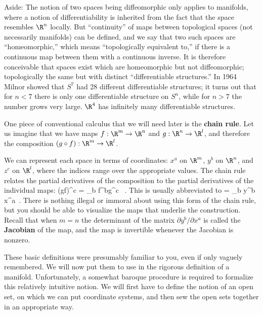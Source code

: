 Aside: The notion of two spaces being diffeomorphic only applies to
manifolds, where a notion of differentiability is inherited from the
fact that the space resembles $\R^n$ locally.  But ``continuity'' of maps
between topological spaces (not necessarily manifolds) can be defined,
and we say that two such spaces are ``homeomorphic,'' which means 
``topologically equivalent to,'' if there is a continuous map 
between them with a continuous inverse.  It is therefore conceivable that
spaces exist which are homeomorphic but not diffeomorphic; topologically
the same but with distinct ``differentiable structures.''  In 1964 Milnor 
showed that $S^7$ had 28 different differentiable structures; 
it turns out that for $n<7$ there is only one differentiable 
structure on $S^n$, while for $n>7$ the number grows very large.  
$\R^4$ has infinitely many differentiable structures.

One piece of conventional calculus that we will need later is the
{\bf chain rule}.  Let us imagine that we have maps $f:\R^m\rightarrow
\R^n$ and $g:\R^n\rightarrow \R^l$, and therefore the composition
$(g\circ f):\R^m\rightarrow\R^l$.  

\begin{figure}[h]
  \centerline{
  }
\end{figure}

\noindent We can represent each space in terms of coordinates:
$x^a$ on $\R^m$, $y^b$ on $\R^n$, and $z^c$ on $\R^l$, where the
indices range over the appropriate values. 
The chain rule relates the partial derivatives of the 
composition to the partial derivatives of the individual maps:
\be
  {{\partial}}(g\circ f)^c =
  \sum_b {{\partial f^b}}{{\partial g^c}
  }\ .\label{2.2}
\ee
This is usually abbreviated to
\be
  {{\partial}} = \sum_b {{\partial y^b}\over
  {\partial x^a}}{{\partial}}\ .\label{2.3}
\ee
There is nothing illegal or immoral about using this form of
the chain rule, but you should be able to visualize the maps that
underlie the construction.  Recall that when $m=n$ the 
determinant of the matrix
$\partial y^b/\partial x^a$ is called the {\bf Jacobian} of the
map, and the map is invertible whenever the
Jacobian is nonzero.

These basic definitions were presumably familiar to you, even if only 
vaguely remembered.  We will now put them to use in the rigorous definition
of a manifold.  Unfortunately, a somewhat baroque procedure is required
to formalize this relatively intuitive notion.  We will first have to
define the notion of an open set, on which we can put coordinate systems,
and then sew the open sets together in an appropriate way.

